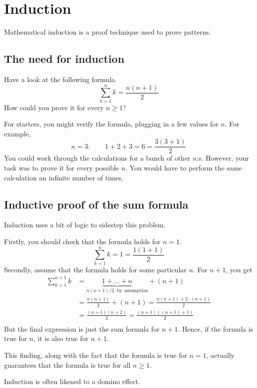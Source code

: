 \documentclass{scrreprt}
\begin{document}
\section*{Induction}
Mathematical induction is a proof technique used to prove patterns.

\subsection*{The need for induction}
Have a look at the following formula.
$$\sum_{k = 1}^n k = \frac{n(n + 1)}{2}$$
How could you prove it for every $n \geq 1$?

For starters, you might verify the formula, plugging in a few values for $n$. For example,
$$n = 3: \qquad 1 + 2 + 3 = 6 = \frac{3(3 + 1)}{2}$$
You could work through the calculations for a bunch of other $n$:s. However, your task was to prove it for every possible $n$. You would have to perform the same calculation an infinite number of times.

\subsection*{Inductive proof of the sum formula}
Induction uses a bit of logic to sidestep this problem.

Firstly, you should check that the formula holds for $n = 1$.
$$\sum_{k = 1}^n k = 1 = \frac{1(1 + 1)}{2}$$
Secondly, assume that the formula holds for some particular $n$. For $n + 1$, you get
\begin{align*}
    \sum_{k = 1}^{n + 1} k &= \underbrace{1 + ... + n}_{n(n + 1)/2 \text{, by assumption}} + (n + 1) \\
    &= \frac{n(n + 1)}{2} + (n + 1) = \frac{n(n + 1) + 2 \cdot (n + 1)}{2}\\
    &= \frac{(n + 1)(n + 2)}{2} = \frac{(n + 1)((n + 1) + 1)}{2} \\
\end{align*}
But the final expression is just the sum formula for $n + 1$. Hence, if the formula is true for $n$, it is also true for $n + 1$.

This finding, along with the fact that the formula is true for $n = 1$, actually guarantees that the formula is true for all $n \geq 1$.

Induction is often likened to a domino effect. 
\end{document}
